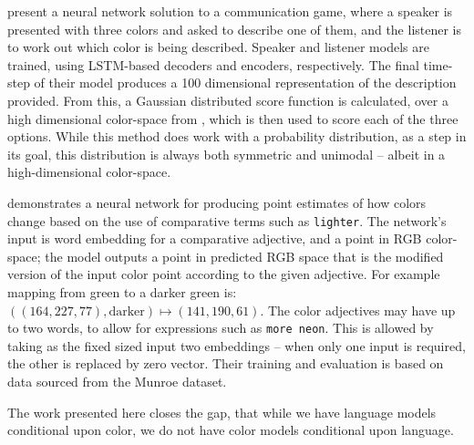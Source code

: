 \documentclass[]{book}
\newcommand{\textcite}{\citet}
\newcommand{\natlang}[1]{\texttt{#1}}
\begin{document}
\textcite{DBLP:journals/corr/MonroeHGP17} present a neural network solution to a communication game, where a speaker is presented with three colors and asked to describe one of them, and the listener is to work out which color is being described.
Speaker and listener models are trained, using LSTM-based decoders and encoders, respectively.
The final time-step of their model produces a 100 dimensional representation of the description provided.
From this, a Gaussian distributed score function is calculated, over a high dimensional color-space from \textcite{2016arXiv160603821M}, which is then used to score each of the three options.
While this method does work with a probability distribution, as a step in its goal,
this distribution is always both symmetric and unimodal -- albeit in a high-dimensional color-space.

\textcite{acl2018WinnLighter} demonstrates a neural network for producing point estimates of how colors change based on the use of comparative terms such as \natlang{lighter}.
The network's input is  word embedding for a comparative adjective, and a point in RGB color-space; the model outputs a point in predicted RGB space that is the modified version of the input color point according to the given adjective.
For example mapping from green to a darker green is: $((164,227,77), \text{darker}) \mapsto (141, 190, 61)$.
The color adjectives may have up to two words, to allow for expressions such as \natlang{more neon}.
This is allowed by taking as the fixed sized input two embeddings -- when only one input is required, the other is replaced by zero vector.
Their training and evaluation is based on data sourced from the  Munroe dataset.


The work presented here closes the gap, that while we have language models conditional upon color,
we do not have color models conditional upon language.
\end{document}
